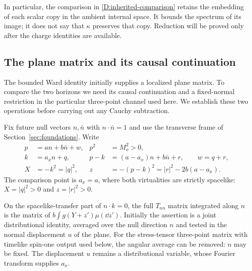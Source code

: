 In particular, the comparison in \eqref{D:inherited-comparison}
retains the embedding of each scalar copy in the ambient internal
space.  It bounds the spectrum of its image; it does not say that
$\kappa$ preserves that copy.  Reduction will be proved only after
the charge identities are available.

\subsection{The plane matrix and its causal continuation}

The bounded Ward identity initially supplies a localized plane matrix.
To compare the two horizons we need its causal continuation and a
fixed-normal restriction in the particular three-point channel used
here.  We establish these two operations before carrying out any
Cauchy subtraction.

Fix future null vectors $n,\bar n$ with $n\cdot\bar n=1$ and use
the transverse frame of Section~\ref{sec:foundations}.  Write
\begin{equation}\label{D:kinematics}
\begin{aligned}
 p&=a n+b\bar n+w, &p^2&=M_o^2>0,\\
 k&=a_x n+q, &p-k&=(a-a_x)n+b\bar n+r,\qquad w=q+r,\\
 X&=-k^2=|q|^2, &z&=-(p-k)^2=|r|^2-2b(a-a_x).
\end{aligned}
\end{equation}
The comparison point is $a_x=a$, where both virtualities are strictly
spacelike: $X=|q|^2>0$ and $z=|r|^2>0$.

\begin{lemma}\label{D:plane-matrix}
On the spacelike-transfer part of $n\cdot k=0$, the full $T_{nn}$
matrix integrated along $n$ is the matrix of
$b\int g(Y+z')\mu(\dd z')$.  Initially the assertion is a joint
distributional identity, averaged over the null direction $n$ and tested
in the normal displacement $u$ of the plane. For the stress-tensor
three-point matrix with timelike spin-one output used below, the angular
average can be removed: $n$ may be fixed. The displacement $u$ remains
a distributional variable, whose Fourier transform supplies $a_x$.
\end{lemma}

